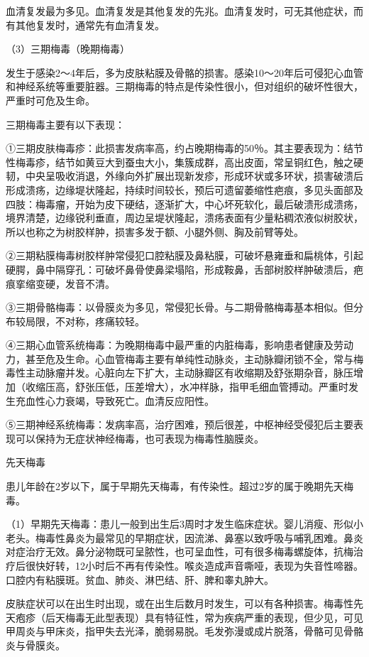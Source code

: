 \documentclass[12pt,UTF8]{ctexbook}
\begin{document}
血清复发最为多见。血清复发是其他复发的先兆。血清复发时，可无其他症状，而有其他复发时，通常先有血清复发。

（3）三期梅毒（晚期梅毒）

发生于感染2～4年后，多为皮肤粘膜及骨骼的损害。感染10～20年后可侵犯心血管和神经系统等重要脏器。三期梅毒的特点是传染性很小，但对组织的破坏性很大，严重时可危及生命。

三期梅毒主要有以下表现：

①三期皮肤梅毒疹：此损害发病率高，约占晚期梅毒的50％。其主要表现为：结节性梅毒疹，结节如黄豆大到蚕虫大小，集簇成群，高出皮面，常呈铜红色，触之硬韧，中央呈吸收消退，外缘向外扩展出现新发疹，形成环状或多环状，损害破溃后形成溃疡，边缘堤状隆起，持续时间较长，预后可遗留萎缩性疤痕，多见头面部及四肢：梅毒瘤，开始为皮下硬结，逐渐扩大，中心坏死软化，最后破溃形成溃疡，境界清楚，边缘锐利垂直，周边呈堤状隆起，溃疡表面有少量粘稠浓液似树胶状，所以也称之为树胶样肿，损害多发于额、小腿外侧、胸及前臂等处。

②三期粘膜梅毒树胶样肿常侵犯口腔粘膜及鼻粘膜，可破坏悬雍垂和扁桃体，引起硬腭，鼻中隔穿孔：可破坏鼻骨使鼻梁塌陷，形成鞍鼻，舌部树胶样肿破溃后，疤痕挛缩变硬，发音不清。

③三期骨骼梅毒：以骨膜炎为多见，常侵犯长骨。与二期骨骼梅毒基本相似。但分布较局限，不对称，疼痛较轻。

④三期心血管系统梅毒：为晚期梅毒中最严重的内脏梅毒，影响患者健康及劳动力，甚至危及生命。心血管梅毒主要有单纯性动脉炎，主动脉瓣闭锁不全，常与梅毒性主动脉瘤并发。心脏向左下扩大，主动脉瓣区有收缩期及舒张期杂音，脉压增加（收缩压高，舒张压低，压差增大），水冲样脉，指甲毛细血管搏动。严重时发生充血性心力衰竭，导致死亡。血清反应阳性。

⑤三期神经系统梅毒：发病率高，治疗困难，预后很差，中枢神经受侵犯后主要表现可以保持为无症状神经梅毒，也可表现为梅毒性脑膜炎。

先天梅毒

患儿年龄在2岁以下，属于早期先天梅毒，有传染性。超过2岁的属于晚期先天梅毒。

（1）早期先天梅毒：患儿一般到出生后3周时才发生临床症状。婴儿消瘦、形似小老头。梅毒性鼻炎为最常见的早期症状，因流涕、鼻塞以致呼吸与哺乳困难。鼻炎对症治疗无效。鼻分泌物既可呈脓性，也可呈血性，可有很多梅毒螺旋体，抗梅治疗后很快好转，12小时后不再有传染性。喉炎造成声音嘶哑，表现为失音性啼器。口腔内有粘膜斑。贫血、肺炎、淋巴结、肝、脾和睾丸肿大。

皮肤症状可以在出生时出现，或在出生后数月时发生，可以有各种损害。梅毒性先天疱疹（后天梅毒无此型表现）具有特征性，常为疾病严重的表现，但少见，可见甲周炎与甲床炎，指甲失去光泽，脆弱易脱。毛发弥漫或成片脱落，骨骼可见骨骼炎与骨膜炎。
\end{document}
